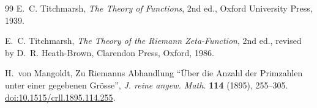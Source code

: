 \documentclass[11pt,reqno]{amsart}
\numberwithin{equation}{section}
\theoremstyle{plain}
\theoremstyle{definition}
\theoremstyle{remark}
\begin{document}
\begin{thebibliography}{99}
E.~C. Titchmarsh, \emph{The Theory of Functions}, 2nd ed., Oxford University Press, 1939.

E.~C. Titchmarsh, \emph{The Theory of the Riemann Zeta-Function}, 2nd ed., revised by D.~R. Heath-Brown, Clarendon Press, Oxford, 1986.

H.~von Mangoldt, Zu Riemanns Abhandlung ``\"Uber die Anzahl der Primzahlen unter einer gegebenen Gr\"osse'', \emph{J. reine angew. Math.} \textbf{114} (1895), 255--305.
\href{https://doi.org/10.1515/crll.1895.114.255}{doi:10.1515/crll.1895.114.255}.

\end{thebibliography}
\end{document}
